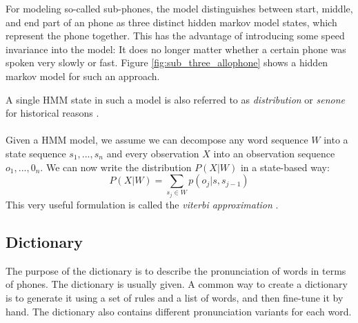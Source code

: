 For modeling so-called sub-phones, the model distinguishes between start, middle, and end part of an phone as three distinct hidden markov model states, which represent the phone together. This has the advantage of introducing some speed invariance into the model: It does no longer matter whether a certain phone was spoken very slowly or fast. Figure \ref{fig:sub_three_allophone} shows a hidden markov model for such an approach. \\
\begin{minipage}{\linewidth}
	\label{fig:sub_three_allophone}
	\hspace{1cm}
\end{minipage}
A single HMM state in such a model is also referred to as \textit{distribution} or \textit{senone} for historical reasons \cite{yu2016automatic}. \\ \\
Given a HMM model, we assume we can decompose any word sequence $W$ into a state sequence $s_1,...,s_n$ and every observation $X$ into an observation sequence $o_1,...,0_n$. We can now write the distribution $P(X|W)$ in a state-based way:
\[
P(X|W) = \sum_{s_j \in W} p(o_j | s, s_{j - 1})
\]
This very useful formulation is called the \textit{viterbi approximation} \cite{huang2001spoken}. 
\subsection{Dictionary}
\label{sec:dictionary}
The purpose of the dictionary is to describe the pronunciation of words in terms of phones. The dictionary is usually given. A common way to create a dictionary is to generate it using a set of rules and a list of words, and then fine-tune it by hand. The dictionary also contains different pronunciation variants for each word. 

